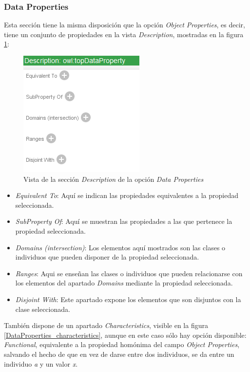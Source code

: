 \subsubsection{Data Properties}
Esta sección tiene la misma disposición que la opción \textit{Object Properties}, es decir, 
tiene un conjunto de propiedades en la vista \textit{Description}, mostradas en la figura 
\ref*{DataProperties_description}:

\begin{figure}[H]
    \centering
    \includegraphics[scale=0.8]{Figures/Protege/DataProperties_description.png}
    \caption{Vista de la sección \textit{Description} de la opción \textit{Data Properties} }
    \label{DataProperties_description}
\end{figure}

\begin{itemize}
    \item \textit{Equivalent To}: Aquí se indican las propiedades equivalentes a la propiedad seleccionada.
    \item \textit{SubProperty Of}: Aquí se muestran las propiedades a las que pertenece la propiedad seleccionada.
    \item \textit{Domains (intersection)}: Los elementos aquí mostrados son las clases o individuos que pueden 
    disponer de la propiedad seleccionada.
    \item \textit{Ranges}: Aqui se enseñan las clases o individuos que pueden relacionarse con los elementos 
    del apartado \textit{Domains} mediante la propiedad seleccionada.
    \item \textit{Disjoint With}: Este apartado expone los elementos que son disjuntos con la clase seleccionada.
\end{itemize}

También dispone de un apartado \textit{Characteristics}, visible en la figura \ref*{DataProperties_characteristics}, 
aunque en este caso sólo hay opción disponible: \textit{Functional}, equivalente a la propiedad homónima del campo 
\textit{Object Properties}, salvando el hecho de que en vez de darse entre dos individuos, se da entre un individuo 
\textit{a} y un valor \textit{x}.

